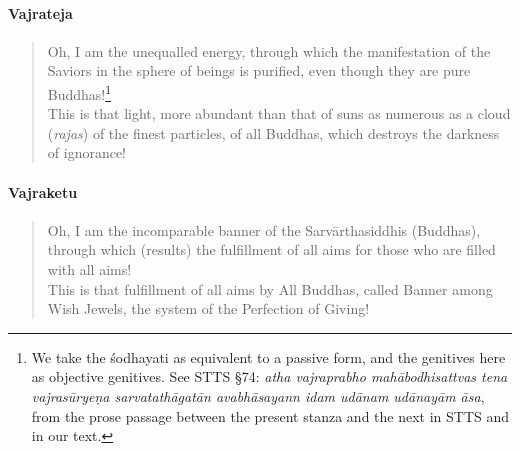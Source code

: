 \documentclass[11pt]{book}
\newcommand{\skt}[1]{\emph{#1}}
\begin{document}
\paragraph{Vajrateja}

\begin{verse}
Oh, I am the unequalled energy, through which the manifestation of the Saviors in the sphere of beings is purified, even though they are pure Buddhas!\footnote{We take the śodhayati as equivalent to a passive form, and the genitives here as objective genitives. See STTS §74: \skt{atha vajraprabho mahābodhisattvas tena vajrasūryeṇa sarvatathāgatān avabhāsayann idam udānam udānayām āsa}, from the prose passage between the present stanza and the next in STTS and in our text.}\\
This is that light, more abundant than that of suns as numerous as a cloud (\skt{rajas}) of the finest particles, of all Buddhas, which destroys the darkness of ignorance!
\end{verse}

\paragraph{Vajraketu}

\begin{verse}
Oh, I am the incomparable banner of the Sarvārthasiddhis (Buddhas), through which (results) the fulfillment of all aims for those who are filled with all aims!\\
This is that fulfillment of all aims by All Buddhas, called Banner among Wish Jewels, the system of the Perfection of Giving!
\end{verse}
\end{document}

